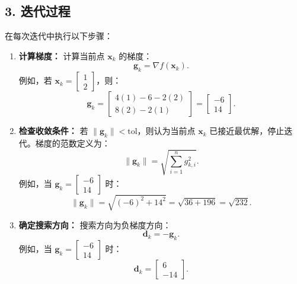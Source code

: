 \documentclass[12pt,a4paper,oneside]{article}
\begin{document}
\subsection*{3. 迭代过程}
在每次迭代中执行以下步骤：
\begin{enumerate}
    \item \textbf{计算梯度：}  
    计算当前点 \(\mathbf{x}_k\) 的梯度：
    \[
    \mathbf{g}_k = \nabla f(\mathbf{x}_k).
    \]
    例如，若 \(\mathbf{x}_k = \begin{bmatrix}1 \\ 2\end{bmatrix}\)，则：
    \[
    \mathbf{g}_k = 
    \begin{bmatrix}
    4(1) - 6 - 2(2) \\
    8(2) - 2(1)
    \end{bmatrix}
    =
    \begin{bmatrix}
    -6 \\
    14
    \end{bmatrix}.
    \]

    \item \textbf{检查收敛条件：}  
    若 \(\|\mathbf{g}_k\| < \text{tol}\)，则认为当前点 \(\mathbf{x}_k\) 已接近最优解，停止迭代。梯度的范数定义为：
    \[
    \|\mathbf{g}_k\| = \sqrt{\sum_{i=1}^n g_{k,i}^2}.
    \]
    例如，当 \(\mathbf{g}_k = \begin{bmatrix}-6 \\ 14\end{bmatrix}\) 时：
    \[
    \|\mathbf{g}_k\| = \sqrt{(-6)^2 + 14^2} = \sqrt{36 + 196} = \sqrt{232}.
    \]

    \item \textbf{确定搜索方向：}  
    搜索方向为负梯度方向：
    \[
    \mathbf{d}_k = -\mathbf{g}_k.
    \]
    例如，当 \(\mathbf{g}_k = \begin{bmatrix}-6 \\ 14\end{bmatrix}\) 时：
    \[
    \mathbf{d}_k = 
    \begin{bmatrix}
    6 \\
    -14
    \end{bmatrix}.
    \]


\end{enumerate}
\end{document}
